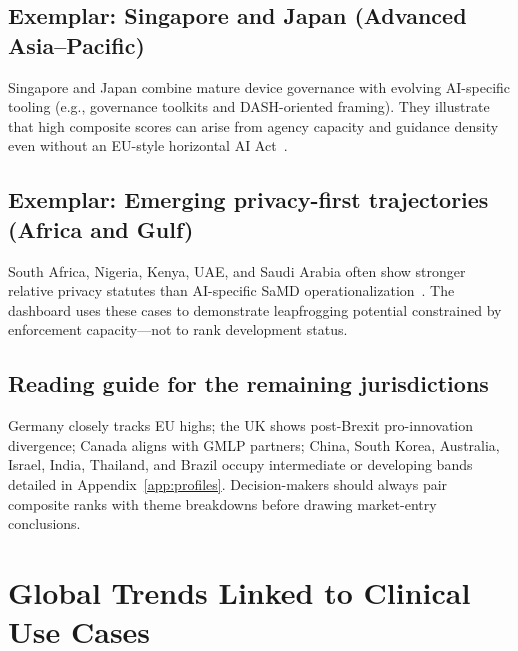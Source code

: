 \subsection{Exemplar: Singapore and Japan (Advanced Asia--Pacific)}
Singapore and Japan combine mature device governance with evolving AI-specific tooling (e.g., governance toolkits and DASH-oriented framing). They illustrate that high composite scores can arise from agency capacity and guidance density even without an EU-style horizontal AI Act~\cite{pmda2020}.

\subsection{Exemplar: Emerging privacy-first trajectories (Africa and Gulf)}
South Africa, Nigeria, Kenya, UAE, and Saudi Arabia often show stronger relative privacy statutes than AI-specific SaMD operationalization~\cite{who2021}. The dashboard uses these cases to demonstrate leapfrogging potential constrained by enforcement capacity---not to rank development status.

\subsection{Reading guide for the remaining jurisdictions}
Germany closely tracks EU highs; the UK shows post-Brexit pro-innovation divergence; Canada aligns with GMLP partners; China, South Korea, Australia, Israel, India, Thailand, and Brazil occupy intermediate or developing bands detailed in Appendix~\ref{app:profiles}. Decision-makers should always pair composite ranks with theme breakdowns before drawing market-entry conclusions.

\section{Global Trends Linked to Clinical Use Cases}
\label{sec:trends}



